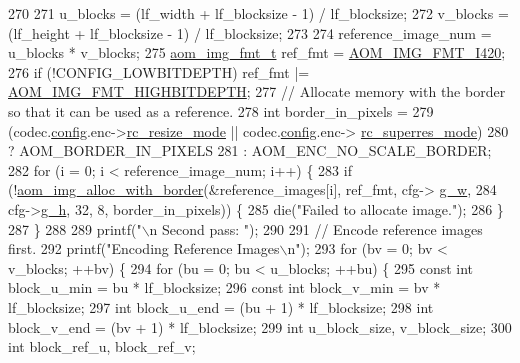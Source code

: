 \begin{DoxyCodeInclude}
{{{{{270 
271   u\_blocks = (lf\_width + lf\_blocksize - 1) / lf\_blocksize;
272   v\_blocks = (lf\_height + lf\_blocksize - 1) / lf\_blocksize;
273 
274   reference\_image\_num = u\_blocks * v\_blocks;
275   \hyperlink{aom__image_8h_ab71efff8c7f49380fad23b93bc2e9bfc}{aom\_img\_fmt\_t} ref\_fmt = \hyperlink{aom__image_8h_a930317c04b4bd0a660bb5e744055523cabd778a3d697463e89d12a1117f417b60}{AOM\_IMG\_FMT\_I420};
276   \textcolor{keywordflow}{if} (!CONFIG\_LOWBITDEPTH) ref\_fmt |= \hyperlink{aom__image_8h_a607b37d91f75442f54223ecd85f1b6cb}{AOM\_IMG\_FMT\_HIGHBITDEPTH};
277   \textcolor{comment}{// Allocate memory with the border so that it can be used as a reference.}
278   \textcolor{keywordtype}{int} border\_in\_pixels =
279       (codec.\hyperlink{structaom__codec__ctx_ac6777025d3b72c9ab49adba78fc70b30}{config}.enc->\hyperlink{structaom__codec__enc__cfg_ab9123d944cd168511d65c823b30d5705}{rc\_resize\_mode} || codec.\hyperlink{structaom__codec__ctx_ac6777025d3b72c9ab49adba78fc70b30}{config}.enc->
      \hyperlink{structaom__codec__enc__cfg_a704ff1b4202b1d5499928b98eef17424}{rc\_superres\_mode})
280           ? AOM\_BORDER\_IN\_PIXELS
281           : AOM\_ENC\_NO\_SCALE\_BORDER;
282   \textcolor{keywordflow}{for} (i = 0; i < reference\_image\_num; i++) \{
283     \textcolor{keywordflow}{if} (!\hyperlink{aom__image_8h_aeb211e5184687f7e10d7c5bed4dcfdcd}{aom\_img\_alloc\_with\_border}(&reference\_images[i], ref\_fmt, cfg->
      \hyperlink{structaom__codec__enc__cfg_a80cb459c5ef3c7e1516f617c4c9d6eab}{g\_w},
284                                    cfg->\hyperlink{structaom__codec__enc__cfg_a37b0f57b63bec8d133df8901d4407ee6}{g\_h}, 32, 8, border\_in\_pixels)) \{
285       die(\textcolor{stringliteral}{"Failed to allocate image."});
286     \}
287   \}
288 
289   printf(\textcolor{stringliteral}{"\(\backslash\)n Second pass: "});
290 
291   \textcolor{comment}{// Encode reference images first.}
292   printf(\textcolor{stringliteral}{"Encoding Reference Images\(\backslash\)n"});
293   \textcolor{keywordflow}{for} (bv = 0; bv < v\_blocks; ++bv) \{
294     \textcolor{keywordflow}{for} (bu = 0; bu < u\_blocks; ++bu) \{
295       \textcolor{keyword}{const} \textcolor{keywordtype}{int} block\_u\_min = bu * lf\_blocksize;
296       \textcolor{keyword}{const} \textcolor{keywordtype}{int} block\_v\_min = bv * lf\_blocksize;
297       \textcolor{keywordtype}{int} block\_u\_end = (bu + 1) * lf\_blocksize;
298       \textcolor{keywordtype}{int} block\_v\_end = (bv + 1) * lf\_blocksize;
299       \textcolor{keywordtype}{int} u\_block\_size, v\_block\_size;
300       \textcolor{keywordtype}{int} block\_ref\_u, block\_ref\_v;
}}}}}
\end{DoxyCodeInclude}
